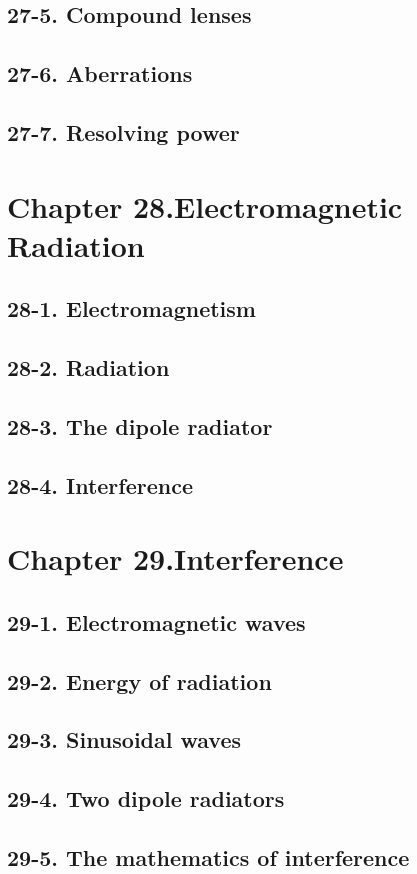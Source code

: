 \documentclass{article}
\begin{document}
\subsection{27-5. Compound lenses}
\subsection{27-6. Aberrations}
\subsection{27-7. Resolving power}
\section{Chapter 28.Electromagnetic Radiation}
\subsection{28-1. Electromagnetism}
\subsection{28-2. Radiation}
\subsection{28-3. The dipole radiator}
\subsection{28-4. Interference}
\section{Chapter 29.Interference}
\subsection{29-1. Electromagnetic waves}
\subsection{29-2. Energy of radiation}
\subsection{29-3. Sinusoidal waves}
\subsection{29-4. Two dipole radiators}
\subsection{29-5. The mathematics of interference}
\end{document}
